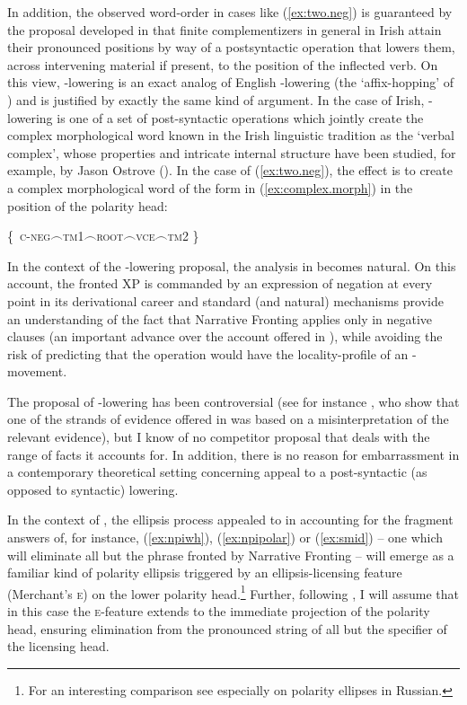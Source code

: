 \documentclass[output=paper,colorlinks,citecolor=brown]{langscibook}
\begin{document}
In addition, the observed word-order in cases like (\ref{ex:two.neg}) is guaranteed by the proposal developed in \citet{mccloskey:96a} that finite complementizers in general in Irish attain their pronounced positions by way of a postsyntactic operation that lowers them, across intervening material if present, to the position of the inflected verb. On this view, \C-lowering is an exact analog of English \T-lowering (the `affix-hopping' of \cite{chomsky:57}) and is justified by exactly the same kind of argument. In the case of Irish, \C-lowering is one of a set of post-syntactic operations which jointly create the complex morphological word known in the Irish linguistic tradition as the `verbal complex', whose properties and intricate internal structure have been studied, for example, by Jason Ostrove (\citeyear{ostrove:18}). In the case of (\ref{ex:two.neg}), the effect is to create a complex morphological word of the form in (\ref{ex:complex.morph}) in the position of the polarity head:

\ea\label{ex:complex.morph}
\{\ {\scshape c-neg}$\frown$\textsc{tm1}$\frown$\textsc{root}$\frown${\scshape vce}$\frown${\scshape tm2}  \}
\z


In the context of the \C-lowering proposal, the analysis in  becomes natural. On this account, the fronted XP is commanded by an expression of negation at every point in its derivational career and standard (and natural) mechanisms provide an understanding of the fact that Narrative Fronting applies only in negative clauses (an important advance over the account offered in \cite{mccloskey:96a}), while avoiding the risk of predicting that the operation would have the locality-profile of an \Abar-movement.

The proposal of \C-lowering has been controversial (see for instance \cite{maki-obaoill:17b}, who show that one of the strands of evidence offered in \cite{mccloskey:96a} was based on a misinterpretation of the relevant evidence), but I know of no competitor proposal that deals with the range of facts it accounts for.  In addition, there is no reason for embarrassment in a contemporary theoretical setting concerning appeal to a post-syntactic (as opposed to syntactic) lowering.
 
In the context of , the ellipsis process appealed to in accounting for the fragment answers of, for instance, (\ref{ex:npiwh}), (\ref{ex:npipolar}) or (\ref{ex:smid}) -- one which will eliminate all but the phrase fronted by Narrative Fronting -- will emerge as a familiar kind of polarity ellipsis triggered by an ellipsis-licensing feature (Merchant's \textsc{e}) on the lower polarity head.\footnote{For an interesting comparison see especially \citet{gribanova:17} on polarity ellipses in Russian.}  Further,  following \citet{pesetsky-benjabi:22}, I will assume that in this case the \textsc{e}-feature extends to the immediate projection of the polarity head, ensuring elimination from the pronounced string of all but the specifier of the licensing head.
\end{document}
